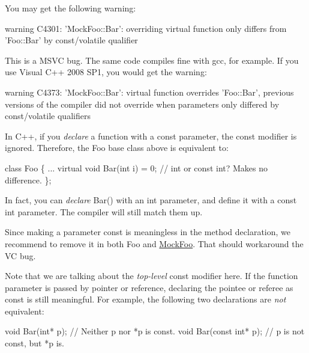You may get the following warning\+:


\begin{DoxyCode}
warning C4301: 'MockFoo::Bar': overriding virtual function only differs from 'Foo::Bar' by const/volatile
       qualifier
\end{DoxyCode}


This is a M\+S\+VC bug. The same code compiles fine with gcc, for example. If you use Visual C++ 2008 S\+P1, you would get the warning\+:


\begin{DoxyCode}
warning C4373: 'MockFoo::Bar': virtual function overrides 'Foo::Bar', previous versions of the compiler did
       not override when parameters only differed by const/volatile qualifiers
\end{DoxyCode}


In C++, if you {\itshape declare} a function with a {\ttfamily const} parameter, the {\ttfamily const} modifier is ignored. Therefore, the {\ttfamily Foo} base class above is equivalent to\+:


\begin{DoxyCode}
\textcolor{keyword}{class }Foo \{
  ...
  \textcolor{keyword}{virtual} \textcolor{keywordtype}{void} Bar(\textcolor{keywordtype}{int} i) = 0;  \textcolor{comment}{// int or const int?  Makes no difference.}
\};
\end{DoxyCode}


In fact, you can {\itshape declare} {\ttfamily Bar()} with an {\ttfamily int} parameter, and define it with a {\ttfamily const int} parameter. The compiler will still match them up.

Since making a parameter {\ttfamily const} is meaningless in the method declaration, we recommend to remove it in both {\ttfamily Foo} and {\ttfamily \mbox{\hyperlink{classMockFoo}{Mock\+Foo}}}. That should workaround the VC bug.

Note that we are talking about the {\itshape top-\/level} {\ttfamily const} modifier here. If the function parameter is passed by pointer or reference, declaring the pointee or referee as {\ttfamily const} is still meaningful. For example, the following two declarations are {\itshape not} equivalent\+:


\begin{DoxyCode}
\textcolor{keywordtype}{void} Bar(\textcolor{keywordtype}{int}* p);         \textcolor{comment}{// Neither p nor *p is const.}
\textcolor{keywordtype}{void} Bar(\textcolor{keyword}{const} \textcolor{keywordtype}{int}* p);  \textcolor{comment}{// p is not const, but *p is.}
\end{DoxyCode}


